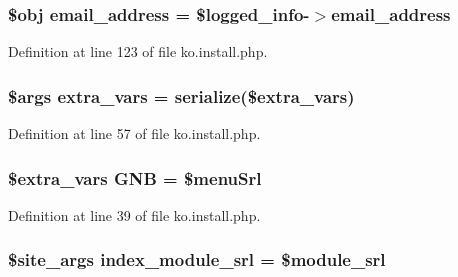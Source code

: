 \hypertarget{ko_8install_8php_a1dffea0d5ba8194f8ef01f414af0c831}{}
\subsubsection[{email\+\_\+address}]{\setlength{\rightskip}{0pt plus 5cm}\$obj email\+\_\+address = \$logged\+\_\+info-\/$>$email\+\_\+address}\label{ko_8install_8php_a1dffea0d5ba8194f8ef01f414af0c831}


Definition at line 123 of file ko.\+install.\+php.

\hypertarget{ko_8install_8php_ae1dcb37fc34a8f312d2e6abd6f806743}{}
\subsubsection[{extra\+\_\+vars}]{\setlength{\rightskip}{0pt plus 5cm}\$args extra\+\_\+vars = serialize(\$extra\+\_\+vars)}\label{ko_8install_8php_ae1dcb37fc34a8f312d2e6abd6f806743}


Definition at line 57 of file ko.\+install.\+php.

\hypertarget{ko_8install_8php_a9b1716b68fc04f3492448f38148dcbf5}{}
\subsubsection[{G\+N\+B}]{\setlength{\rightskip}{0pt plus 5cm}\${\bf extra\+\_\+vars} G\+N\+B = \$menu\+Srl}\label{ko_8install_8php_a9b1716b68fc04f3492448f38148dcbf5}


Definition at line 39 of file ko.\+install.\+php.

\hypertarget{ko_8install_8php_acd0b17bfe6d14c82871d73fa39c9c22d}{}
\subsubsection[{index\+\_\+module\+\_\+srl}]{\setlength{\rightskip}{0pt plus 5cm}\$site\+\_\+args index\+\_\+module\+\_\+srl = \${\bf module\+\_\+srl}}\label{ko_8install_8php_acd0b17bfe6d14c82871d73fa39c9c22d}


